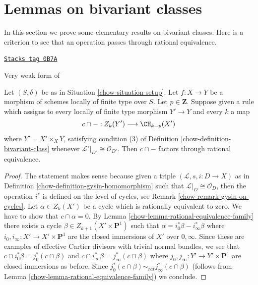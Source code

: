 \section{Lemmas on bivariant classes}
\label{chow-section-bivariant-II}
In this section we prove some elementary results on bivariant classes.
Here is a criterion to see that an operation
passes through rational equivalence.

\begin{lemma}
\label{chow-lemma-factors-through-rational-equivalence}
\href{https://stacks.math.columbia.edu/tag/0B7A}{\texttt{Stacks tag 0B7A}}

\begin{reference}
Very weak form of \cite[Theorem 17.1]{F}
\end{reference}
Let $(S, \delta)$ be as in Situation \ref{chow-situation-setup}.
Let $f : X \to Y$ be a morphism of schemes locally of finite type over $S$.
Let $p \in \mathbf{Z}$. Suppose given a rule
which assigns to every locally of finite type morphism $Y' \to Y$
and every $k$ a map
$$
c \cap - : Z_k(Y') \longrightarrow \CH_{k - p}(X')
$$
where $Y' = X' \times_X Y$, satisfying condition (3) of
Definition \ref{chow-definition-bivariant-class}
whenever $\mathcal{L}'|_{D'} \cong \mathcal{O}_{D'}$. Then
$c \cap -$ factors through rational equivalence.
\end{lemma}

\begin{proof}

The statement makes sense because given a triple
$(\mathcal{L}, s, i : D \to X)$ as in
Definition \ref{chow-definition-gysin-homomorphism}
such that $\mathcal{L}|_D \cong \mathcal{O}_D$, then
the operation $i^*$ is defined on the level of cycles, see
Remark \ref{chow-remark-gysin-on-cycles}.
Let $\alpha \in Z_k(X')$ be a cycle which is rationally equivalent to zero.
We have to show that $c \cap \alpha = 0$. By
Lemma \ref{chow-lemma-rational-equivalence-family}
there exists a cycle $\beta \in Z_{k + 1}(X' \times \mathbf{P}^1)$
such that $\alpha = i_0^*\beta - i_\infty^*\beta$
where $i_0, i_\infty : X' \to X' \times \mathbf{P}^1$ are the
closed immersions of $X'$ over $0, \infty$. Since these are
examples of effective Cartier divisors with trivial normal
bundles, we see that $c \cap i_0^*\beta = j_0^*(c \cap \beta)$
and $c \cap i_\infty^*\beta = j_\infty^*(c \cap \beta)$
where $j_0, j_\infty : Y' \to Y' \times \mathbf{P}^1$ are
closed immersions as before. Since
$j_0^*(c \cap \beta) \sim_{rat} j_\infty^*(c \cap \beta)$
(follows from Lemma \ref{chow-lemma-rational-equivalence-family}) we conclude.
\end{proof}

